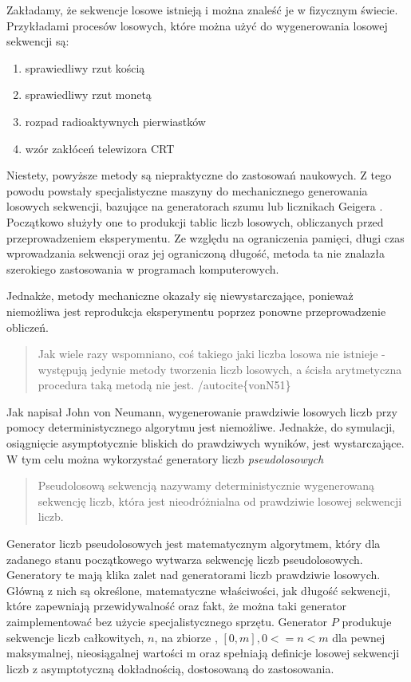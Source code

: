 Zakładamy, że sekwencje losowe istnieją i można znaleść je w fizycznym świecie. Przykładami procesów losowych, które można użyć do wygenerowania losowej sekwencji są:

\begin{enumerate}
\tightlist
\item
  sprawiedliwy rzut kością
\item
  sprawiedliwy rzut monetą
\item
  rozpad radioaktywnych pierwiastków
\item
  wzór zakłóceń telewizora CRT
\end{enumerate}

Niestety, powyższe metody są niepraktyczne do zastosowań naukowych. Z tego powodu powstały specjalistyczne maszyny do mechanicznego generowania losowych sekwencji, bazujące na generatorach szumu lub licznikach Geigera . Początkowo służyły one to produkcji tablic liczb losowych, obliczanych przed przeprowadzeniem eksperymentu. Ze względu na ograniczenia pamięci, długi czas wprowadzania sekwencji oraz jej ograniczoną długość, metoda ta nie znalazła szerokiego zastosowania w programach komputerowych.

Jednakże, metody mechaniczne okazały się niewystarczające, ponieważ niemożliwa jest reprodukcja eksperymentu poprzez ponowne przeprowadzenie obliczeń.

\begin{quote}
Jak wiele razy wspomniano, coś takiego jaki liczba losowa nie istnieje - występują jedynie metody tworzenia liczb losowych, a ścisła arytmetyczna procedura taką metodą nie jest. /autocite\{vonN51\}
\end{quote}

Jak napisał John von Neumann, wygenerowanie prawdziwie losowych liczb przy pomocy deterministycznego algorytmu jest niemożliwe. Jednakże, do symulacji, osiągnięcie asymptotycznie bliskich do prawdziwych wyników, jest wystarczające.
W tym celu można wykorzystać generatory liczb \emph{pseudolosowych}

\begin{quote}
Pseudolosową sekwencją nazywamy deterministycznie wygenerowaną sekwencję liczb, która jest nieodróżnialna od prawdziwie losowej sekwencji liczb.
\end{quote}

Generator liczb pseudolosowych jest matematycznym algorytmem, który dla zadanego stanu początkowego wytwarza sekwencję liczb pseudolosowych. Generatory te mają klika zalet nad generatorami liczb prawdziwie losowych. Główną z nich są określone, matematyczne właściwości, jak długość sekwencji, które zapewniają przewidywalność oraz fakt, że można taki generator zaimplementować bez użycie specjalistycznego sprzętu.
Generator \(P\) produkuje sekwencje liczb całkowitych, \(n\), na zbiorze , \([0,m], 0 <= n < m\) dla pewnej maksymalnej, nieosiągalnej wartości m oraz spełniają definicje losowej sekwencji liczb z asymptotyczną dokładnością, dostosowaną do zastosowania.

